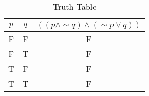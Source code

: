 \begin{table}[ht]
\caption{Truth Table}
\centering
\begin{tabular}{|c|c||c|}
\hline
$ p $ & $ q $ & $ ((p \wedge  \sim q) \wedge ( \sim p \vee q)) $ \\
\hline
F & F & F \\
F & T & F \\
T & F & F \\
T & T & F \\
\hline
\end{tabular}
\label{table:tt1}
\end{table}
